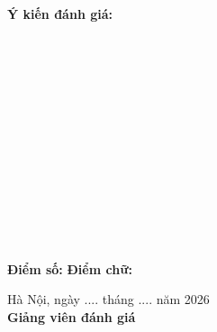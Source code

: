 \thispagestyle{empty}
\vspace{1cm}

\noindent \textbf{Ý kiến đánh giá:} \dotfill

\vspace{0.5cm}

\noindent\makebox[\textwidth][l]{\dotfill}\\[0.4cm]
\noindent\makebox[\textwidth][l]{\dotfill}\\[0.4cm]
\noindent\makebox[\textwidth][l]{\dotfill}\\[0.4cm]
\noindent\makebox[\textwidth][l]{\dotfill}\\[0.4cm]
\noindent\makebox[\textwidth][l]{\dotfill}\\[0.4cm]
\noindent\makebox[\textwidth][l]{\dotfill}\\[0.4cm]
\noindent\makebox[\textwidth][l]{\dotfill}\\[0.4cm]
\noindent\makebox[\textwidth][l]{\dotfill}\\[0.4cm]
\noindent\makebox[\textwidth][l]{\dotfill}\\[0.4cm]
\noindent\makebox[\textwidth][l]{\dotfill}\\[0.4cm]
\noindent\makebox[\textwidth][l]{\dotfill}\\[0.4cm]
\noindent\makebox[\textwidth][l]{\dotfill}\\[0.4cm]

\vspace{0.6cm}

\noindent \textbf{Điểm số:} \dotfill \hfill \textbf{Điểm chữ:} \dotfill

\vspace{1.5cm}

\begin{flushright}
Hà Nội, ngày .... tháng .... năm 2026\\[0.5cm]
{\rightskip=1.5cm
\textbf{Giảng viên đánh giá}\\
}
\vspace{0.7cm}
{\rightskip=1.3cm
\textbf{}\\
}
\end{flushright}